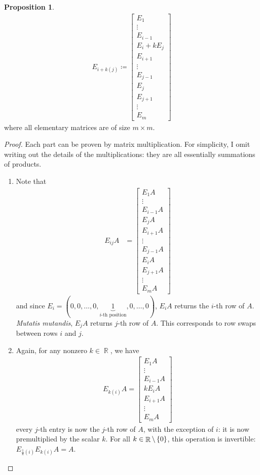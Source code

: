 \documentclass{amsart}
\theoremstyle{definition}
\newtheorem{proposition}[definition]{Proposition}
\theoremstyle{definition}
\DeclareMathOperator{\R}{\mathbb{R}}
\DeclareMathOperator{\1}{\mathbbm{1}}
\begin{document}
\begin{enumerate}[itemsep = 2mm]
\begin{proposition}
\begin{align*}
			E_{i + k(j)} \coloneqq \begin{bmatrix} E_1 \\ \vdots \\ E_{i-1} \\ E_{i} + k E_{j} \\ E_{i+1} \\ \vdots \\ E_{j-1} \\ E_j \\ E_{j+1} \\ \vdots \\ E_m \end{bmatrix}
			\end{align*}
			where all elementary matrices are of size $m \times m$.
		\end{proposition}
		
		\begin{proof}
			Each part can be proven by matrix multiplication. For simplicity, I omit writing out the details of the multiplications: they are all essentially summations of products.
			\begin{enumerate}
				\item Note that
				\begin{align*}
				E_{ij} A &= \begin{bmatrix} E_1 A  \\ \vdots \\ E_{i-1} A \\ E_{j} A \\ E_{i+1} A \\ \vdots \\ E_{j-1} A \\ E_i A \\ E_{j+1} A \\ \vdots \\ E_m A \end{bmatrix}
				\end{align*}
				and since $E_i = (0,0,\dots, 0, \underbrace{1}_{i\text{-th position}} ,0, \dots, 0)$, $E_i A $ returns the $i$-th row of $A$. \textit{Mutatis mutandis}, $E_j A$ returns $j$-th row of $A$. This corresponds to row swaps between rows $i$ and $j$.
				
				
				\item Again, for any nonzero $k \in \R$, we have
				\begin{align*}
				E_{k(i)} A = \begin{bmatrix} E_1 A  \\ \vdots \\ E_{i-1} A \\ k E_{i} A \\ E_{i+1} A \\ \vdots \\ E_m A \end{bmatrix}
				\end{align*}
				every $j$-th entry is now the $j$-th row of $A$, with the exception of $i$: it is now premultiplied by the scalar $k$. For all $k \in \R \setminus \set{0}$, this operation is invertible: $E_{\frac{1}{k}(i)} E_{k(i)} A = A$.
				

\end{enumerate}
\end{proof}
\end{enumerate}
\end{document}
